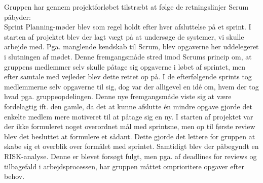 Gruppen har gennem projektforløbet tilstræbt at følge de retningslinjer Scrum påbyder:\\
Sprint Planning-møder blev som regel holdt efter hver afsluttelse på et sprint. I starten af projektet blev der lagt vægt på at undersøge de systemer, vi skulle
arbejde med. Pga. manglende kendskab til Scrum, blev opgaverne her uddelegeret i slutningen af mødet. Denne fremgangsmåde stred imod Scrums princip om, at gruppens
medlemmer selv skulle påtage sig opgaverne i løbet af sprintet, men efter samtale med vejleder blev dette rettet op på. I de efterfølgende sprints tog medlemmerne
selv opgaverne til sig, dog var der alligevel en idé om, hvem der tog hvad pga. gruppeopdelingen. Denne nye fremgangsmåde viste sig at være fordelagtig ift. den gamle,
da det at kunne afslutte én mindre opgave gjorde det enkelte medlem mere motiveret til at påtage sig en ny.
I starten af projektet var der ikke formuleret noget overordnet mål med sprintsne, men op til første review blev det besluttet at formulere et sådant. Dette gjorde
det lettere for gruppen at skabe sig et overblik over formålet med sprintet. Samtidigt blev der påbegyndt en RISK-analyse. Denne er blevet forsøgt fulgt, men
pga. af deadlines for reviews og tilbagefald i arbejdsprocessen, har gruppen måttet omprioritere opgaver efter behov.
